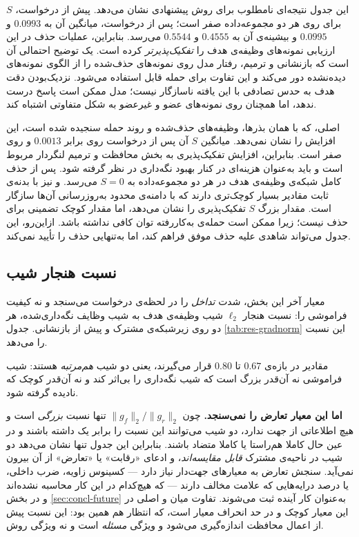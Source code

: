 

این جدول نتیجه‌ای نامطلوب برای روش پیشنهادی نشان می‌دهد. پیش از درخواست، $S$ برای  روی هر دو مجموعه‌داده صفر است؛ پس از درخواست، میانگین آن به $0.0993$ و $0.0995$ و بیشینه‌ی آن به $0.4555$ و $0.5544$ می‌رسد. بنابراین، عملیات حذف در این ارزیابی نمونه‌های وظیفه‌ی هدف را \emph{تفکیک‌پذیرتر} کرده است. یک توضیح احتمالی آن است که بازنشانی و ترمیم، رفتار مدل روی نمونه‌های حذف‌شده را از الگوی نمونه‌های دیده‌نشده دور می‌کند و این تفاوت برای حمله قابل استفاده می‌شود. نزدیک‌بودن دقت هدف به حدس تصادفی با این یافته ناسازگار نیست؛ مدل ممکن است پاسخ درست ندهد، اما همچنان روی نمونه‌های عضو و غیرعضو به شکل متفاوتی اشتباه کند.

 اصلی، که با همان بذرها، وظیفه‌های حذف‌شده و روند حمله سنجیده شده است، این افزایش را نشان نمی‌دهد. میانگین $S$ آن پس از درخواست روی  برابر $0.0013$ و روی  صفر است. بنابراین، افزایش تفکیک‌پذیری به بخش محافظت و ترمیم لنگردار  مربوط است و باید به‌عنوان هزینه‌ای در کنار بهبود نگه‌داری در نظر گرفته شود.  پس از حذف کامل شبکه‌ی وظیفه‌ی هدف در هر دو مجموعه‌داده به $S=0$ می‌رسد.  و  نیز با بدنه‌ی ثابت مقادیر بسیار کوچک‌تری دارند که با دامنه‌ی محدود به‌روزرسانی آن‌ها سازگار است. مقدار بزرگ $S$ تفکیک‌پذیری را نشان می‌دهد، اما مقدار کوچک تضمینی برای حذف نیست؛ زیرا ممکن است حمله‌ی به‌کاررفته توان کافی نداشته باشد. ازاین‌رو، این جدول می‌تواند شاهدی علیه حذف موفق فراهم کند، اما به‌تنهایی حذف را تأیید نمی‌کند.

\subsection{نسبت هنجار شیب}
\label{subsec:res-gradnorm}

معیار آخر این بخش، شدت \emph{تداخل} را در لحظه‌ی درخواست می‌سنجد و نه کیفیت فراموشی را: نسبت هنجار $\ell_2$ شیب وظیفه‌ی هدف به شیب وظایف نگه‌داری‌شده، هر دو روی زیرشبکه‌ی مشترک و پیش از بازنشانی. جدول \ref{tab:res-gradnorm} این نسبت را می‌دهد.



مقادیر در بازه‌ی $0.67$ تا $0.80$ قرار می‌گیرند، یعنی دو شیب \emph{هم‌مرتبه} هستند: شیب فراموشی نه آن‌قدر بزرگ است که شیب نگه‌داری را بی‌اثر کند و نه آن‌قدر کوچک که نادیده گرفته شود.

\textbf{اما این معیار تعارض را نمی‌سنجد.} چون $\|g_f\|_2/\|g_r\|_2$ تنها نسبت \emph{بزرگی} است و هیچ اطلاعاتی از جهت ندارد، دو شیب می‌توانند این نسبت را برابر یک داشته باشند و در عین حال کاملا هم‌راستا یا کاملا متضاد باشند. بنابراین این جدول تنها نشان می‌دهد دو شیب در ناحیه‌ی مشترک \emph{قابل مقایسه‌اند}، و ادعای «رقابت» یا «تعارض» از آن بیرون نمی‌آید. سنجش تعارض به معیارهای جهت‌دار نیاز دارد — کسینوس زاویه، ضرب داخلی، یا درصد درایه‌هایی که علامت مخالف دارند — که هیچ‌کدام در این کار محاسبه نشده‌اند و در بخش \ref{sec:concl-future} به‌عنوان کار آینده ثبت می‌شوند. تفاوت میان  و  اصلی در این معیار کوچک و در حد انحراف معیار است، که انتظار هم همین بود: این نسبت پیش از اعمال محافظت اندازه‌گیری می‌شود و ویژگی \emph{مسئله} است و نه ویژگی روش.

